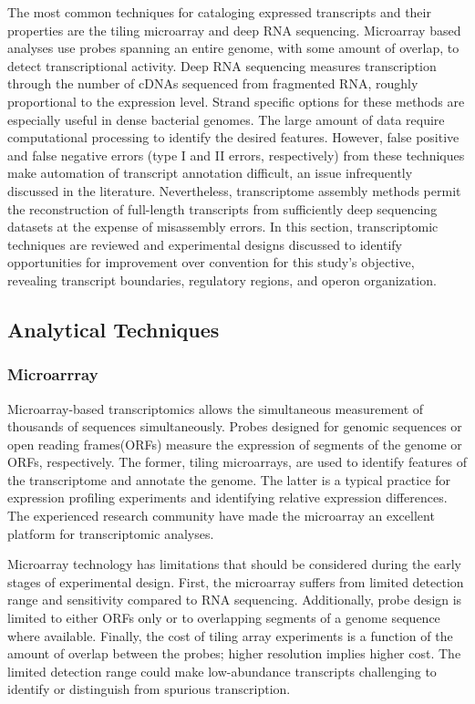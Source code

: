 The most common techniques for cataloging expressed transcripts and their properties are the tiling microarray\cite{162} and deep RNA sequencing\cite{115}. Microarray based analyses use probes spanning an entire genome, with some amount of overlap, to detect transcriptional activity.\cite{197} Deep RNA sequencing\cite{115} measures transcription through the number of cDNAs sequenced from fragmented RNA, roughly proportional to the expression level.\cite{198} Strand specific options for these methods are especially useful in dense bacterial genomes.\cite{162,115} The large amount of data require computational processing to identify the desired features.\cite{199,200} However, false positive and false negative errors (type I and II errors, respectively) from these techniques make automation of transcript annotation difficult, an issue infrequently discussed in the literature. Nevertheless, transcriptome assembly methods permit the reconstruction of full-length transcripts from sufficiently deep sequencing datasets at the expense of misassembly errors.\cite{108} In this section, transcriptomic techniques are reviewed and experimental designs discussed to identify opportunities for improvement over convention for this study's objective, revealing transcript boundaries, regulatory regions, and operon organization.

\subsection{Analytical Techniques}
\subsubsection{Microarrray}
Microarray-based transcriptomics allows the simultaneous measurement of thousands of sequences simultaneously.\cite{151} Probes designed for genomic sequences or open reading frames(ORFs) measure the expression of segments of the genome or ORFs, respectively. The former, tiling microarrays, are used to identify features of the transcriptome and annotate the genome. The latter is a typical practice for expression profiling experiments and identifying relative expression differences.\cite{151,162} The experienced research community have made the microarray an excellent platform for transcriptomic analyses.

Microarray technology has limitations that should be considered during the early stages of experimental design. First, the microarray suffers from limited detection range and sensitivity compared to RNA sequencing.\cite{163} Additionally, probe design is limited to either ORFs only or to overlapping segments of a genome sequence where available.\cite{153} Finally, the cost of tiling array experiments is a function of the amount of overlap between the probes; higher resolution implies higher cost.\cite{163} The limited detection range could make low-abundance transcripts challenging to identify or distinguish from spurious transcription.\cite{164,165}

